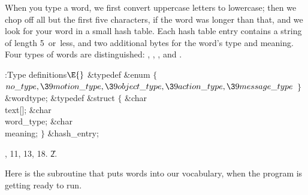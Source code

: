 \fi

When you type a word, we first convert uppercase letters to
lowercase; then
we chop off all but the first five characters, if the word was longer than
that, and we look for your word in a small hash table. Each hash table entry
contains a string of length 5~or~less, and two additional bytes for the word's
type and meaning. Four types of words are distinguished: ,
, , and .

\Y\B\4:Type definitions\X${}\E{}$\6
\&{typedef} \&{enum}\5
${}\{{}$\1\6
${}\\{no\_type},\39\\{motion\_type},\39\\{object\_type},\39\\{action\_type},\39%
\\{message\_type}{}$\2\6
${}\}{}$ \&{wordtype};\6
\&{typedef} \&{struct} ${}\{{}$\1\6
\&{char} \\{text}[];\6
\&{char} \\{word\_type};\6
\&{char} \\{meaning};\2\6
${}\}{}$ \&{hash\_entry};\par
{}, 11, 13, 18.
\U2.\fi

Here is the subroutine that puts words into our vocabulary,
when the
program is getting ready to run.

